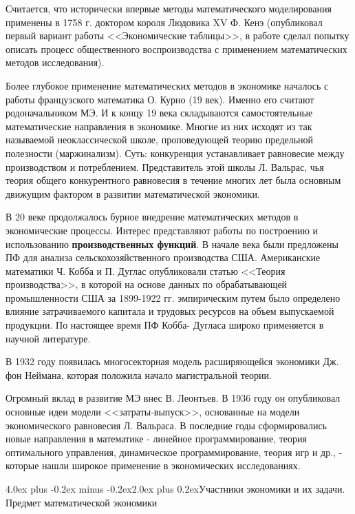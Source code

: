 \documentclass[12pt, 4paper]{book}
\makeatletter
\renewcommand{\section}{\@startsection{section}{1}{1pt}%
	{4.0ex plus -0.2ex minus -0.2ex}{2.0ex plus 0.2ex}{\centering\bf}}%
\makeatother
\begin{document}
{Считается, что исторически впервые методы математического моделирования применены в 1758 г. доктором короля Людовика XV Ф. Кенэ (опубликовал первый вариант работы <<Экономические таблицы>>, в работе сделал попытку описать процесс общественного воспроизводства с применением математических методов исследования).
\par 
Более глубокое применение математических методов в экономике началось с работы французского математика О. Курно (19 век). Именно его считают родоначальником МЭ. И к концу 19 века складываются самостоятельные математические направления в экономике. Многие из них исходят из так называемой неоклассической школе, проповедующей теорию предельной полезности (маржинализм). Суть: конкуренция устанавливает равновесие между производством и потреблением. Представитель этой школы Л. Вальрас, чья теория общего конкурентного равновесия в течение многих лет была основным движущим фактором в развитии математической экономики.
\par
В 20 веке продолжалось бурное внедрение математических методов в экономические процессы. Интерес представляют работы по построению и использованию \textbf{производственных функций}. В начале века были предложены ПФ для анализа сельскохозяйственного производства США. Американские математики Ч. Кобба и П. Дуглас опубликовали статью <<Теория производства>>, в которой на основе данных по обрабатывающей промышленности США за 1899-1922 гг. эмпирическим путем было определено влияние затрачиваемого капитала и трудовых ресурсов на объем выпускаемой продукции. По настоящее время ПФ Кобба- Дугласа широко применяется в научной литературе.
\par
В 1932 году появилась многосекторная модель расширяющейся экономики Дж. фон Неймана, которая положила начало магистральной теории.
\par
Огромный вклад в развитие МЭ внес В. Леонтьев. В 1936 году он опубликовал основные идеи модели <<затраты-выпуск>>, основанные на модели экономического равновесия Л. Вальраса.
В последние годы сформировались новые направления в математике - линейное программирование, теория оптимального управления, динамическое программирование, теория игр и др., - которые нашли широкое применение в экономических исследованиях.

\section{Участники экономики и их задачи. Предмет математической экономики}

}
\end{document}
